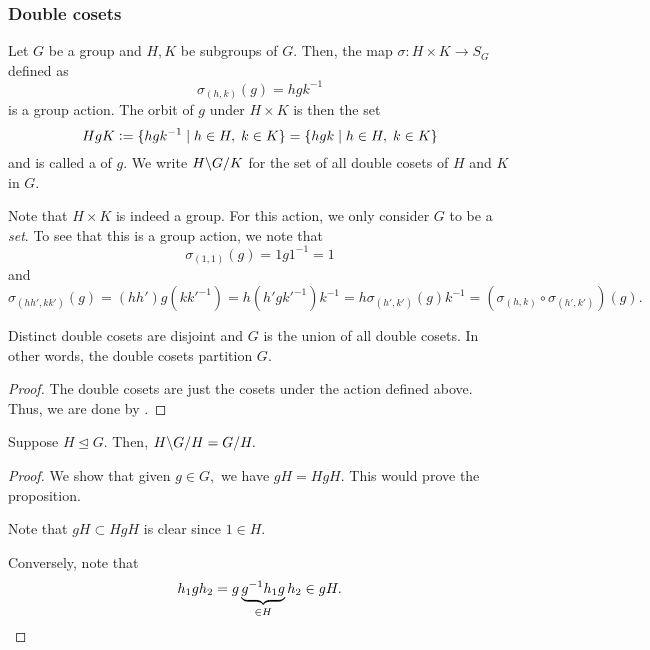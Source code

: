 \subsubsection{Double cosets} \label{subsubsec:doublecosets}

\begin{defn}%
	\label{defn:doublecosets}
	Let $G$ be a group and $H, K$ be subgroups of $G.$ Then, the map $\sigma : H \times K \to S_G$ defined as
	\begin{equation*} 
		\sigma_{(h, k)}(g) = hgk^{-1}
	\end{equation*}
	is a group action. The orbit of $g$ under $H \times K$ is then the set
	\begin{equation*} 
		HgK \vcentcolon= \{hgk^{-1} \mid h \in H,\; k \in K\} = \{hgk \mid h \in H,\; k \in K\}
	\end{equation*}
	and is called a  of $g.$ We write $\dcos{H}{G}{K}$ for the set of all double cosets of $H$ and $K$ in $G.$
\end{defn}

\begin{rem}
	Note that $H \times K$ is indeed a group. For this action, we only consider $G$ to be a \emph{set}. To see that this is a group action, we note that
	\begin{equation*} 
		\sigma_{(1, 1)}(g) = 1g1^{-1} = 1
	\end{equation*}
	and
	\begin{equation*} 
		\sigma_{(hh', kk')}(g) = (hh')g(kk'^{-1}) = h(h'gk'^{-1})k^{-1} = h\sigma_{(h', k')}(g)k^{-1} = \left(\sigma_{(h, k)} \circ \sigma_{(h', k')}\right)(g).
	\end{equation*}
\end{rem}

\begin{prop}
	Distinct double cosets are disjoint and $G$ is the union of all double cosets. In other words, the double cosets partition $G.$
\end{prop}
\begin{proof} 
	The double cosets are just the cosets under the action defined above. Thus, we are done by .
\end{proof}

\begin{prop} \label{prop:dcosetsofnormal}
	Suppose $H \unlhd G.$ Then, $\dcos{H}{G}{H} = G/H.$
\end{prop}
\begin{proof} 
	We show that given $g \in G,$ we have $gH = HgH.$ This would prove the proposition.

	Note that $gH \subset HgH$ is clear since $1 \in H.$

	Conversely, note that
	\begin{equation*} 
		h_1gh_2 = g\underbrace{g^{-1}h_1g}_{\in H}h_2 \in gH. \qedhere
	\end{equation*}
\end{proof}

